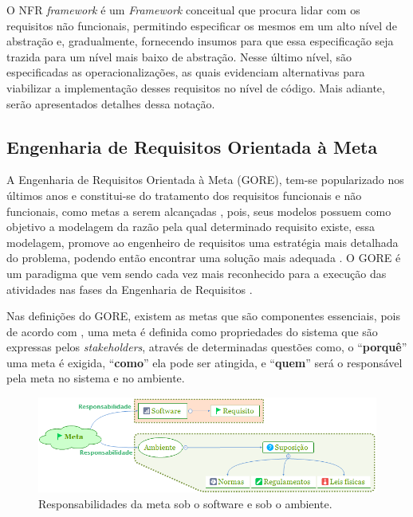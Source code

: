 O NFR \textit{framework} é um \textit{Framework} conceitual que procura lidar com os requisitos não funcionais, permitindo especificar os mesmos em um alto nível de abstração e, gradualmente, fornecendo insumos para que essa especificação seja trazida para um nível mais baixo de abstração. Nesse último nível, são especificadas as operacionalizações, as quais evidenciam alternativas para viabilizar a implementação desses requisitos no nível de código. Mais adiante, serão apresentados detalhes dessa notação.

\subsection{Engenharia de Requisitos Orientada à Meta}
\label{subsec:orientacaoMeta}

A Engenharia de Requisitos Orientada à Meta (GORE), tem-se popularizado nos últimos anos e constitui-se do tratamento dos requisitos funcionais e não funcionais, como metas a serem alcançadas \cite{van2001goal}, pois, seus modelos possuem como objetivo a modelagem da razão pela qual determinado requisito existe, essa modelagem, promove ao engenheiro de requisitos uma estratégia mais detalhada do problema, podendo então encontrar uma solução mais adequada \cite{van2001goal}\cite{chung2012non}. O GORE é um paradigma que vem sendo cada vez mais reconhecido para a execução das atividades nas fases da Engenharia de Requisitos \cite{van2001goal}.

Nas definições do GORE, existem as metas que são componentes essenciais, pois de acordo com \cite{van2001goal}, uma meta é definida como propriedades do sistema que são expressas pelos \textit{stakeholders}, através de determinadas questões como, o “\textbf{porquê}” uma meta é exigida, “\textbf{como}” ela pode ser atingida, e “\textbf{quem}” será o responsável pela meta no sistema e no ambiente.

\begin{figure}[h]
	\centering
	\includegraphics[keepaspectratio=true,scale=0.8]{figuras/GORE.png}
	\caption{Responsabilidades da meta sob o software e sob o ambiente.}
	\label{Gore}
\end{figure}

